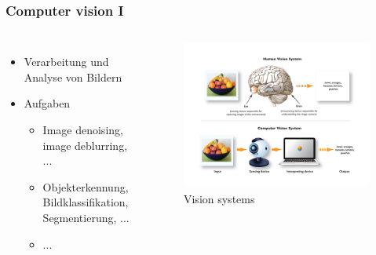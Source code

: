 \documentclass[aspectratio=43, 11pt]{beamer}
\begin{document}
		\begin{frame}
			\frametitle{Computer vision I}
			\begin{columns}
					\begin{itemize}
		 		  	\item Verarbeitung und Analyse von Bildern
						\item Aufgaben
							\begin{itemize}
								\item Image denoising, image deblurring, ...
								\item Objekterkennung, Bildklassifikation, Segmentierung, ...
								\item ...
							\end{itemize}
					\end{itemize}
					\begin{figure}[t]
						\includegraphics[width=1.5\textwidth]{computer_vision_2}
						\caption{\tiny Vision systems}
					\end{figure}
			\end{columns}
		\end{frame}
\end{document}

